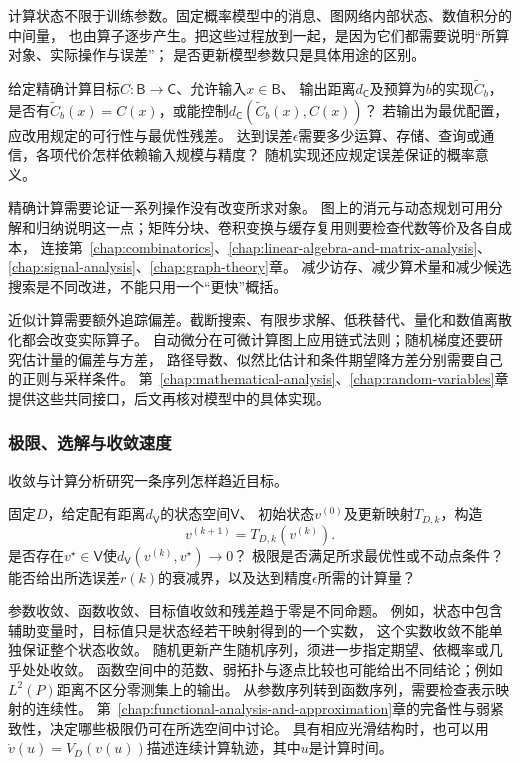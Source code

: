 计算状态不限于训练参数。固定概率模型中的消息、图网络内部状态、数值积分的中间量，
也由算子逐步产生。把这些过程放到一起，是因为它们都需要说明“所算对象、实际操作与误差”；
是否更新模型参数只是具体用途的区别。

\begin{mathproblem}
  \label{question:future-computation}
  给定精确计算目标$C:\mathsf B\to\mathsf C$、允许输入$x\in\mathsf B$、
  输出距离$d_{\mathsf C}$及预算为$b$的实现$\widetilde C_b$，
  是否有$\widetilde C_b(x)=C(x)$，或能控制$d_{\mathsf C}(\widetilde C_b(x),C(x))$？
  若输出为最优配置，应改用规定的可行性与最优性残差。
  达到误差$\epsilon$需要多少运算、存储、查询或通信，各项代价怎样依赖输入规模与精度？
  随机实现还应规定误差保证的概率意义。
\end{mathproblem}

精确计算需要论证一系列操作没有改变所求对象。
图上的消元与动态规划可用分解和归纳说明这一点；矩阵分块、卷积变换与缓存复用则要检查代数等价及各自成本，
连接第~\ref{chap:combinatorics}、\ref{chap:linear-algebra-and-matrix-analysis}、\ref{chap:signal-analysis}、\ref{chap:graph-theory}章。
减少访存、减少算术量和减少候选搜索是不同改进，不能只用一个“更快”概括。

近似计算需要额外追踪偏差。截断搜索、有限步求解、低秩替代、量化和数值离散化都会改变实际算子。
自动微分在可微计算图上应用链式法则；随机梯度还要研究估计量的偏差与方差，
路径导数、似然比估计和条件期望降方差分别需要自己的正则与采样条件。
第~\ref{chap:mathematical-analysis}、\ref{chap:random-variables}章提供这些共同接口，后文再核对模型中的具体实现。

\subsubsection{极限、选解与收敛速度}
\label{sec:future-analysis-convergence}

收敛与计算分析研究一条序列怎样趋近目标。

\begin{mathproblem}[训练序列的极限与速度]
  \label{question:future-convergence}
  固定$D$，给定配有距离$d_{\mathsf V}$的状态空间$\mathsf V$、
  初始状态$v^{(0)}$及更新映射$T_{D,k}$，构造
  \[
    v^{(k+1)}=T_{D,k}(v^{(k)}).
  \]
  是否存在$v^\star\in\mathsf V$使$d_{\mathsf V}(v^{(k)},v^\star)\to0$？
  极限是否满足所求最优性或不动点条件？
  能否给出所选误差$r(k)$的衰减界，以及达到精度$\epsilon$所需的计算量？
\end{mathproblem}

参数收敛、函数收敛、目标值收敛和残差趋于零是不同命题。
例如，状态中包含辅助变量时，目标值只是状态经若干映射得到的一个实数，
这个实数收敛不能单独保证整个状态收敛。
随机更新产生随机序列，须进一步指定期望、依概率或几乎处处收敛。
函数空间中的范数、弱拓扑与逐点比较也可能给出不同结论；例如$L^2(P)$距离不区分零测集上的输出。
从参数序列转到函数序列，需要检查表示映射的连续性。
第~\ref{chap:functional-analysis-and-approximation}章的完备性与弱紧致性，决定哪些极限仍可在所选空间中讨论。
具有相应光滑结构时，也可以用$\dot v(u)=V_D(v(u))$描述连续计算轨迹，其中$u$是计算时间。

